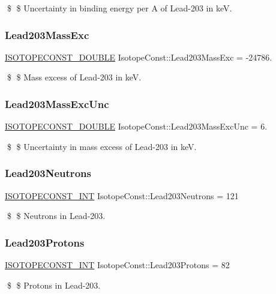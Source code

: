 \$ \$ Uncertainty in binding energy per A of Lead-\/203 in keV. \mbox{\label{group___isotope_const-_lead-_pb203_gad2cec79e6554ee704d33e9c27cc375b3}} 
\subsubsection{\texorpdfstring{Lead203\+Mass\+Exc}{Lead203MassExc}}
{\footnotesize\ttfamily \mbox{\hyperlink{group___isotope_const-_macros_ga8f45a7272ce02c0b4c65c44636ed719a}{I\+S\+O\+T\+O\+P\+E\+C\+O\+N\+S\+T\+\_\+\+D\+O\+U\+B\+LE}} Isotope\+Const\+::\+Lead203\+Mass\+Exc = -\/24786.}

\$ \$ Mass excess of Lead-\/203 in keV. \mbox{\label{group___isotope_const-_lead-_pb203_gadbb907d9715b3758beb7905a5d38ae3a}} 
\subsubsection{\texorpdfstring{Lead203\+Mass\+Exc\+Unc}{Lead203MassExcUnc}}
{\footnotesize\ttfamily \mbox{\hyperlink{group___isotope_const-_macros_ga8f45a7272ce02c0b4c65c44636ed719a}{I\+S\+O\+T\+O\+P\+E\+C\+O\+N\+S\+T\+\_\+\+D\+O\+U\+B\+LE}} Isotope\+Const\+::\+Lead203\+Mass\+Exc\+Unc = 6.}

\$ \$ Uncertainty in mass excess of Lead-\/203 in keV. \mbox{\label{group___isotope_const-_lead-_pb203_gabf9ce7aaeea976367dbe5ac41662c5c1}} 
\subsubsection{\texorpdfstring{Lead203\+Neutrons}{Lead203Neutrons}}
{\footnotesize\ttfamily \mbox{\hyperlink{group___isotope_const-_macros_ga5f18360b3e99483a35c32d789e62621c}{I\+S\+O\+T\+O\+P\+E\+C\+O\+N\+S\+T\+\_\+\+I\+NT}} Isotope\+Const\+::\+Lead203\+Neutrons = 121}

\$ \$ Neutrons in Lead-\/203. \mbox{\label{group___isotope_const-_lead-_pb203_gad52c1b218a15f53da574824bd424ac6a}} 
\subsubsection{\texorpdfstring{Lead203\+Protons}{Lead203Protons}}
{\footnotesize\ttfamily \mbox{\hyperlink{group___isotope_const-_macros_ga5f18360b3e99483a35c32d789e62621c}{I\+S\+O\+T\+O\+P\+E\+C\+O\+N\+S\+T\+\_\+\+I\+NT}} Isotope\+Const\+::\+Lead203\+Protons = 82}

\$ \$ Protons in Lead-\/203. 